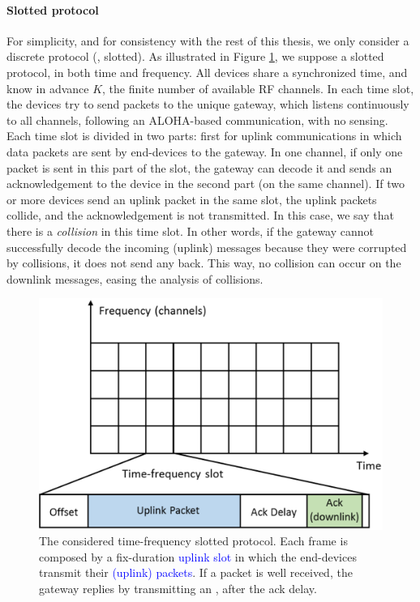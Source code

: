 \paragraph{Slotted protocol}
%
For simplicity, and for consistency with the rest of this thesis, we only consider a discrete protocol (\ie, slotted).
As illustrated in Figure \ref{fig:41:protocol}, we suppose a slotted protocol, in both time and frequency.
All devices share a synchronized time, and know in advance $K$, the finite number of available RF channels.
In each time slot, the devices try to send packets to the unique gateway, which listens continuously to all channels, following an ALOHA-based communication, with no sensing.
Each time slot is divided in two parts: first for uplink communications in which data packets are sent by end-devices to the gateway.
In one channel, if only one packet is sent in this part of the slot, the gateway can decode it and sends an acknowledgement to the device in the second part (on the same channel).
If two or more devices send an uplink packet in the same slot, the uplink packets collide, and the acknowledgement \Ack{} is not transmitted. In this case, we say that there is a \emph{collision} in this time slot.
In other words, if the gateway cannot successfully decode the incoming (uplink) messages because they were corrupted by collisions, it does not send any \Ack{} back.
This way, no collision can occur on the downlink messages, easing the analysis of collisions.

\begin{figure}[!t]
    \centering
    \includegraphics[scale=0.40]{protocol.eps}
    \caption{The considered time-frequency slotted protocol. Each frame is composed by a fix-duration \textcolor{blue}{uplink slot} in which the end-devices transmit their \textcolor{blue}{(uplink) packets}. If a packet is well received, the gateway replies by transmitting an \textcolor{darkgreen}{\Ack}, after the ack delay.}
    \label{fig:41:protocol}
\end{figure}


